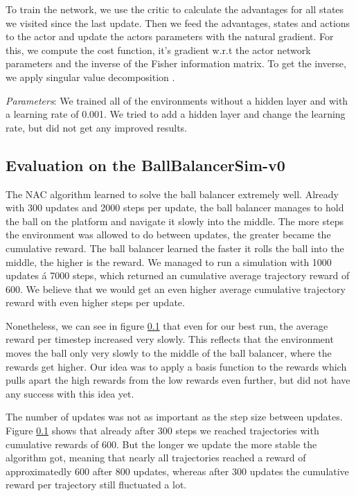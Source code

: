 To train the network, we use the critic to calculate the advantages for all states we visited since the last update. Then we feed the advantages, states and actions to the actor and update the actors parameters with the natural gradient. For this, we compute the cost function, it's gradient w.r.t the actor network parameters and the inverse of the Fisher information matrix. To get the inverse, we apply singular value decomposition \citep{golub1965calculating}.

\textit{Parameters}: We trained all of the environments without a hidden layer and with a learning rate of 0.001. We tried to add a hidden layer and change the learning rate, but did not get any improved results.

\subsection{Evaluation on the BallBalancerSim-v0}

The NAC algorithm learned to solve the ball balancer extremely well. Already with 300 updates and 2000 steps per update, the ball balancer manages to hold the ball on the platform and navigate it slowly into the middle. The more steps the environment was allowed to do between updates, the greater became the cumulative reward. The ball balancer learned the faster it rolls the ball into the middle, the higher is the reward. We managed to run a simulation with 1000 updates á 7000 steps, which returned an cumulative average trajectory reward of 600. We believe that we would get an even higher average cumulative trajectory reward with even higher steps per update. 

Nonetheless, we can see in figure \ref{} that even for our best run, the average reward per timestep increased very slowly. This reflects that the environment moves the ball only very slowly to the middle of the ball balancer, where the rewards get higher. Our idea was to apply a basis function to the rewards which pulls apart the high rewards from the low rewards even further, but did not have any success with this idea yet.

The number of updates was not as important as the step size between updates. Figure \ref{} shows that already after 300 steps we reached trajectories with cumulative rewards of 600. But the longer we update the more stable the algorithm got, meaning that nearly all trajectories reached a reward of approximatedly 600 after 800 updates, whereas after 300 updates the cumulative reward per trajectory still fluctuated a lot. 


